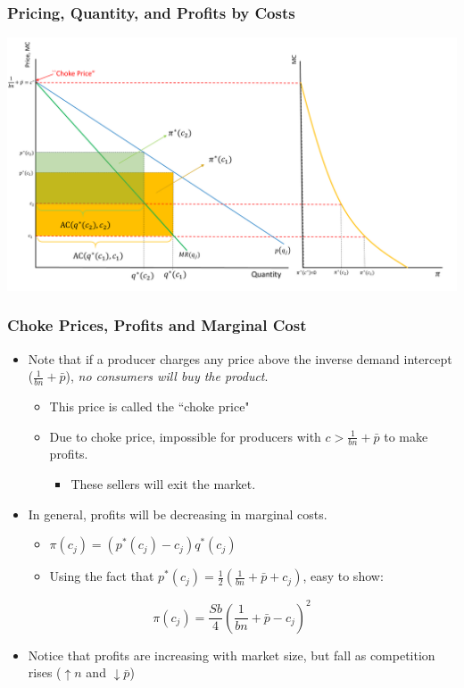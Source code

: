 \documentclass{beamer}
\begin{document}
\begin{frame}
	\frametitle{Pricing, Quantity, and Profits by Costs}
	\includegraphics[scale=0.32]{SL3_1.pdf}

\end{frame}

\begin{frame}
	\frametitle{Choke Prices, Profits and Marginal Cost}
\begin{itemize}
	\item Note that if a producer charges any price above the inverse demand intercept ($\frac{1}{bn}+\bar{p}$), \emph{no consumers will buy the product}. 
		\begin{itemize}
			\item This price is called the ``choke price"
			\item Due to choke price, impossible for producers with $c>\frac{1}{bn}+\bar{p}$ to make profits.
				\begin{itemize}
					\item These sellers will exit the market.
				\end{itemize}
		\end{itemize}
	\item In general, profits will be decreasing in marginal costs. 
		\begin{itemize}
			\item $\pi(c_j)=(p^*(c_j)-c_j)q^*(c_j)$
			\item Using the fact that $p^*(c_j)=\frac{1}{2}\left(\frac{1}{bn}+\bar{p} + c_j\right)$, easy to show:
		\end{itemize}
\end{itemize}
			\begin{equation}
			\pi(c_j)=\frac{Sb}{4}\left(\frac{1}{bn}+\bar{p} -c_j \right)^2 \nonumber
			\end{equation}
			\begin{itemize}
				\item Notice that profits are increasing with market size, but fall as competition rises ($\uparrow n$ and $\downarrow \bar{p}$)
			\end{itemize}
			
\end{frame}
\end{document}
